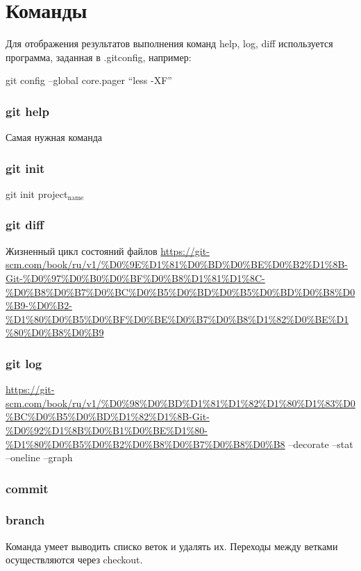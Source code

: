 \documentclass[bigger]{beamer}
\begin{document}
\section{Команды}
\label{sec-3}

Для отображения результатов выполнения команд help, log, diff
используется программа, заданная в .gitconfig, например: 

git config --global core.pager ``less -XF''
\begin{frame}
\frametitle{git help}
\label{sec-3-1}

Самая нужная команда 
\end{frame}
\begin{frame}
\frametitle{git init}
\label{sec-3-2}

git init project$_{\mathrm{name}}$
\end{frame}
\begin{frame}
\frametitle{git diff}
\label{sec-3-3}

Жизненный цикл состояний файлов
\href{https://git-scm.com/book/ru/v1/%D0%9E%D1%81%D0%BD%D0%BE%D0%B2%D1%8B-Git-%D0%97%D0%B0%D0%BF%D0%B8%D1%81%D1%8C-%D0%B8%D0%B7%D0%BC%D0%B5%D0%BD%D0%B5%D0%BD%D0%B8%D0%B9-%D0%B2-%D1%80%D0%B5%D0%BF%D0%BE%D0%B7%D0%B8%D1%82%D0%BE%D1%80%D0%B8%D0%B9}{https://git-scm.com/book/ru/v1/\%D0\%9E\%D1\%81\%D0\%BD\%D0\%BE\%D0\%B2\%D1\%8B-Git-\%D0\%97\%D0\%B0\%D0\%BF\%D0\%B8\%D1\%81\%D1\%8C-\%D0\%B8\%D0\%B7\%D0\%BC\%D0\%B5\%D0\%BD\%D0\%B5\%D0\%BD\%D0\%B8\%D0\%B9-\%D0\%B2-\%D1\%80\%D0\%B5\%D0\%BF\%D0\%BE\%D0\%B7\%D0\%B8\%D1\%82\%D0\%BE\%D1\%80\%D0\%B8\%D0\%B9}
\end{frame}
\begin{frame}
\frametitle{git log}
\label{sec-3-4}

\href{https://git-scm.com/book/ru/v1/%D0%98%D0%BD%D1%81%D1%82%D1%80%D1%83%D0%BC%D0%B5%D0%BD%D1%82%D1%8B-Git-%D0%92%D1%8B%D0%B1%D0%BE%D1%80-%D1%80%D0%B5%D0%B2%D0%B8%D0%B7%D0%B8%D0%B8}{https://git-scm.com/book/ru/v1/\%D0\%98\%D0\%BD\%D1\%81\%D1\%82\%D1\%80\%D1\%83\%D0\%BC\%D0\%B5\%D0\%BD\%D1\%82\%D1\%8B-Git-\%D0\%92\%D1\%8B\%D0\%B1\%D0\%BE\%D1\%80-\%D1\%80\%D0\%B5\%D0\%B2\%D0\%B8\%D0\%B7\%D0\%B8\%D0\%B8}
--decorate
--stat
--oneline
--graph
\end{frame}
\begin{frame}
\frametitle{commit}
\label{sec-3-5}
\end{frame}
\begin{frame}
\frametitle{branch}
\label{sec-3-6}

Команда умеет выводить списко веток и удалять их.
Переходы между ветками осуществляются через checkout.
\end{frame}
\end{document}

